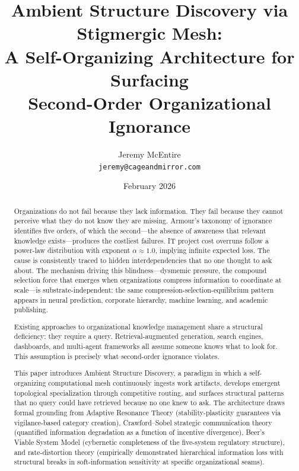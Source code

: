 \documentclass[11pt,a4paper]{article}
\title{Ambient Structure Discovery via Stigmergic Mesh:\\
A Self-Organizing Architecture for Surfacing\\
Second-Order Organizational Ignorance}
\author{Jeremy McEntire\\
\texttt{jeremy@cageandmirror.com}}
\date{February 2026}
\begin{document}
\maketitle

\begin{abstract}
Organizations do not fail because they lack information. They fail because they cannot perceive what they do not know they are missing. Armour's taxonomy of ignorance identifies five orders, of which the second---the absence of awareness that relevant knowledge exists---produces the costliest failures. IT project cost overruns follow a power-law distribution with exponent $\alpha \approx 1.0$, implying infinite expected loss. The cause is consistently traced to hidden interdependencies that no one thought to ask about. The mechanism driving this blindness---dysmemic pressure, the compound selection force that emerges when organizations compress information to coordinate at scale---is substrate-independent: the same compression-selection-equilibrium pattern appears in neural prediction, corporate hierarchy, machine learning, and academic publishing.

Existing approaches to organizational knowledge management share a structural deficiency: they require a query. Retrieval-augmented generation, search engines, dashboards, and multi-agent frameworks all assume someone knows what to look for. This assumption is precisely what second-order ignorance violates.

This paper introduces Ambient Structure Discovery, a paradigm in which a self-organizing computational mesh continuously ingests work artifacts, develops emergent topological specialization through competitive routing, and surfaces structural patterns that no query could have retrieved because no one knew to ask. The architecture draws formal grounding from Adaptive Resonance Theory (stability-plasticity guarantees via vigilance-based category creation), Crawford--Sobel strategic communication theory (quantified information degradation as a function of incentive divergence), Beer's Viable System Model (cybernetic completeness of the five-system regulatory structure), and rate-distortion theory (empirically demonstrated hierarchical information loss with structural breaks in soft-information sensitivity at specific organizational seams).


\end{abstract}
\end{document}
